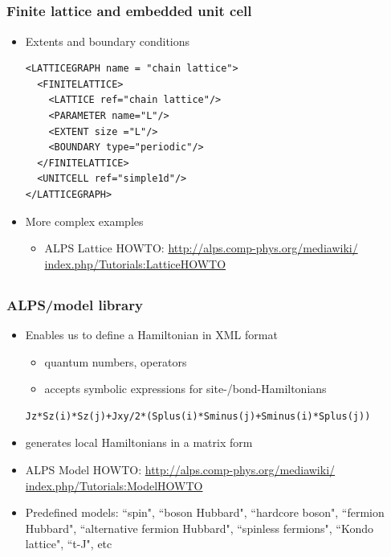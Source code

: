 \subsection*{\redm\whiteb\greenb}
\begin{frame}[t,fragile]
  \frametitle{Finite lattice and embedded unit cell}
  \begin{itemize}
  \item Extents and boundary conditions
    \begin{lstlisting}
<LATTICEGRAPH name = "chain lattice">
  <FINITELATTICE>
    <LATTICE ref="chain lattice"/>
    <PARAMETER name="L"/>
    <EXTENT size ="L"/>
    <BOUNDARY type="periodic"/>
  </FINITELATTICE>
  <UNITCELL ref="simple1d"/>
</LATTICEGRAPH>
\end{lstlisting}
  \item More complex examples
    \begin{itemize}
    \item ALPS Lattice HOWTO: {\small \href{http://alps.comp-phys.org/mediawiki/index.php/Tutorials:LatticeHOWTO}{http://alps.comp-phys.org/mediawiki/ index.php/Tutorials:LatticeHOWTO}}
    \end{itemize}
  \end{itemize}
\end{frame}

\subsection*{\redm\whiteb\greenb}
\begin{frame}[t,fragile]
  \frametitle{ALPS/model library}
  \begin{itemize}
  \item Enables us to define a Hamiltonian in XML format
    \begin{itemize}  
    \item quantum numbers, operators
    \item accepts symbolic expressions for site-/bond-Hamiltonians
    \end{itemize}
    \begin{lstlisting}
Jz*Sz(i)*Sz(j)+Jxy/2*(Splus(i)*Sminus(j)+Sminus(i)*Splus(j))
\end{lstlisting}
  \item generates local Hamiltonians in a matrix form
  \item ALPS Model HOWTO: {\small \href{http://alps.comp-phys.org/mediawiki/index.php/Tutorials:ModelHOWTO}{http://alps.comp-phys.org/mediawiki/ index.php/Tutorials:ModelHOWTO}}
  \item Predefined models: ``spin", ``boson Hubbard", ``hardcore boson", ``fermion Hubbard", ``alternative fermion Hubbard", ``spinless fermions", ``Kondo lattice", ``t-J", etc
  \end{itemize}
\end{frame}

